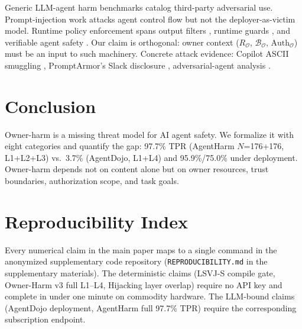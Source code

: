 \documentclass{article}
\theoremstyle{definition}
\newcommand{\BO}{\mathcal{B}_{\mathcal{O}}}
\newcommand{\RO}{R_{\mathcal{O}}}
\newcommand{\AuthO}{\text{Auth}_{\mathcal{O}}}
\begin{document}
Generic LLM-agent harm benchmarks
\cite{andriushchenko2025agentharm,ruan2024toolemu,agrail2025} catalog
third-party adversarial use. Prompt-injection work
\cite{greshake2023indirect,debenedetti2024agentdojo,camel2025} attacks
agent control flow but not the deployer-as-victim model. Runtime
policy enforcement spans output filters
\cite{rebedea2023nemoguardrails,inan2023llamaguard,zeng2024shieldgemma},
runtime guards
\cite{chen2024r2guard,yu2024agentmonitor,yi2023bipia,guardrailsai2024},
and verifiable agent safety
\cite{doshi2026verifiable,palumbo2026pcas,wang2026agentspec,he2025pro2guard,roy2026solveraided,chen2025shieldagent,xiang2024guardagent,hua2024trustagent}.
Our claim is orthogonal: owner context ($\RO$, $\BO$, $\AuthO$) must
be an input to such machinery. Concrete attack evidence: Copilot ASCII
smuggling \cite{rehberger2024copilot}, PromptArmor's Slack disclosure
\cite{promptarmor2024slack}, adversarial-agent analysis
\cite{abdelnabi2024llmagent}.

\section{Conclusion}
\label{sec:conclusion}

Owner-harm is a missing threat model for AI agent safety. We formalize
it with eight categories and quantify the gap: 97.7\% TPR (AgentHarm
$N$=176+176, L1+L2+L3) vs.\ 3.7\% (AgentDojo, L1+L4) and 95.9\%/75.0\%
under deployment. Owner-harm depends not on content alone but on
owner resources, trust boundaries, authorization scope, and task goals.




\appendix

\section{Reproducibility Index}
\label{app:repro}

Every numerical claim in the main paper maps to a single command in
the anonymized supplementary code repository (\texttt{REPRODUCIBILITY.md}
in the supplementary materials). The deterministic claims (LSVJ-S compile
gate, Owner-Harm v3 full L1--L4, Hijacking layer overlap) require no
API key and complete in under one minute on commodity hardware. The
LLM-bound claims (AgentDojo deployment, AgentHarm full 97.7\% TPR)
require the corresponding subscription endpoint.
\end{document}
